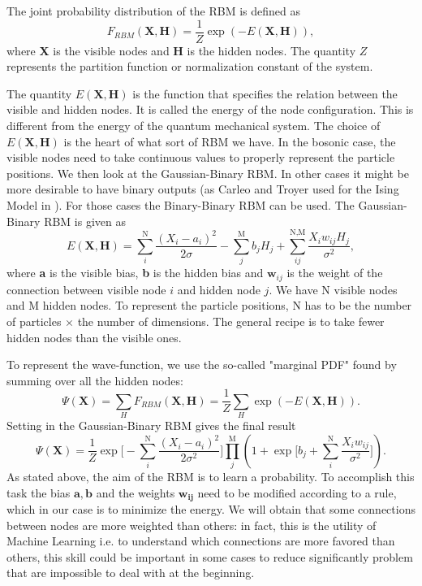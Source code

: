 The joint probability distribution of the RBM is defined as 
\begin{equation*}
F_{RBM}(\textbf{X},\textbf{H}) = \frac{1}{Z} \exp(-E(\textbf{X},\textbf{H})),
\end{equation*}
where \textbf{X} is the visible nodes and \textbf{H} is the hidden nodes. The quantity $Z$ represents the partition function or normalization constant of the system. 

The quantity $E(\textbf{X},\textbf{H})$ is the function that specifies the relation between the visible and hidden nodes. It is called the energy of the node configuration. This is different from the energy of the quantum mechanical system. The choice of $E(\textbf{X},\textbf{H})$ is the heart of what sort of RBM we have. In the bosonic case, the visible nodes need to take continuous values to properly represent the particle positions. We then look at the Gaussian-Binary RBM. In other cases it might be more desirable to have binary outputs (as Carleo and Troyer used for the Ising Model in \cite{carleoSolvingQuantumManybody2017}). For those cases the Binary-Binary RBM can be used. The Gaussian-Binary RBM is given as 
\begin{equation*}
E(\textbf{X},\textbf{H}) = \sum_i^{\text{N}}\frac{(X_i-a_i)^2}{2\sigma} - \sum_j^{\text{M}}b_jH_j + \sum_{ij}^{\text{N,M}}\frac{X_iw_{ij}H_j}{\sigma^2},
\label{eq_rbm}
\end{equation*}
where \textbf{a} is the visible bias, \textbf{b} is the hidden bias and $\textbf{w}_{ij}$ is the weight of the connection between visible node $i$ and hidden node $j$. We have N visible nodes and M hidden nodes. To represent the particle positions, N has to be the number of particles $\times$ the number of dimensions.  The general recipe is to take fewer hidden nodes than the visible ones.

To represent the wave-function, we use the so-called "marginal PDF" found by summing over all the hidden nodes:
\begin{equation*}
\Psi(\textbf{X}) = \sum_HF_{RBM}(\textbf{X},\textbf{H}) = \frac{1}{Z}\sum_H\exp(-E(\textbf{X},\textbf{H})).
\end{equation*}
Setting in the Gaussian-Binary RBM gives the final result
\begin{equation*}
\Psi(\mathbf{X}) = \frac{1}{Z} \exp\bigg[-\sum_i^{\text{N}} \frac{(X_i-a_i)^2}{2\sigma^2}\bigg]\prod_j^{\text{M}} \left(  1 + \exp\bigg[b_j +\sum_i^{\text{N}} \frac{X_iw_{ij}}{\sigma^2}\bigg]\right).
\label{eq_psi}
\end{equation*}
As stated above, the aim of the RBM is to learn a probability. To accomplish this task the bias $\mathbf{a},\mathbf{b}$ and the weights $\mathbf{w_{ij}}$ need to be modified according to a rule, which in our case is to minimize the energy. We will obtain that some connections between nodes are more weighted than others: in fact, this is the utility of Machine Learning i.e. to understand which connections are more favored than others, this skill could be important in some cases to reduce significantly problem that are impossible to deal with at the beginning.

